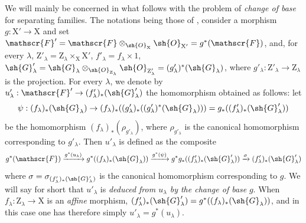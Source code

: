 \begin{env}[11.9.5]
\label{IV.11.9.5}
We will mainly be concerned in what follows with the problem of \emph{change of base} for separating families.
The notations being those of , consider a morphism $g:\mathrm{X}'\to\mathrm{X}$ and set $\mathscr{F}'=\mathscr{F}\otimes_{\sh{O}_\mathrm{X}}\sh{O}_{\mathrm{X}'}=g^*(\mathscr{F})$, and, for every $\lambda$, $\mathrm{Z}'_\lambda=\mathrm{Z}_\lambda\times_\mathrm{X}\mathrm{X}'$, $f'_\lambda=f_\lambda\times 1$, $\sh{G}'_\lambda=\sh{G}_\lambda\otimes_{\sh{O}_{\mathrm{Z}_\lambda}}\sh{O}_{\mathrm{Z}'_\lambda}=(g'_\lambda)^*(\sh{G}_\lambda)$, where $g'_\lambda:\mathrm{Z}'_\lambda\to\mathrm{Z}_\lambda$ is the projection.
For every $\lambda$, we denote by $u'_\lambda:\mathscr{F}'\to(f'_\lambda)_*(\sh{G}'_\lambda)$ the homomorphism obtained as follows: let
\[
  \psi:(f_\lambda)_*(\sh{G}_\lambda)\to(f_\lambda)_*((g'_\lambda)_*((g'_\lambda)^*(\sh{G}_\lambda)))=g_*((f'_\lambda)_*(\sh{G}'_\lambda))
\]
be the homomorphism $(f_\lambda)_*(\rho_{g'_\lambda})$, where $\rho_{g'_\lambda}$ is the canonical homomorphism  corresponding to $g'_\lambda$.
Then $u'_\lambda$ is defined as the composite
\[
  g^*(\mathscr{F})\xrightarrow{g^*(u_\lambda)}g^*((f_\lambda)_*(\sh{G}_\lambda))\xrightarrow{g^*(\psi)}g^*g_*((f'_\lambda)_*(\sh{G}'_\lambda))\xrightarrow{\sigma}(f'_\lambda)_*(\sh{G}'_\lambda)
\]
where $\sigma=\sigma_{(f'_\lambda)_*(\sh{G}'_\lambda)}$ is the canonical homomorphism  corresponding to $g$.
We will say for short that $u'_\lambda$ is \emph{deduced from $u_\lambda$ by the change of base} $g$.
When $f_\lambda:\mathrm{Z}_\lambda\to\mathrm{X}$ is an \emph{affine} morphism, $(f'_\lambda)_*(\sh{G}'_\lambda)=g^*((f_\lambda)_*(\sh{G}_\lambda))$, and in this case one has therefore simply $u'_\lambda=g^*(u_\lambda)$.


\end{env}
